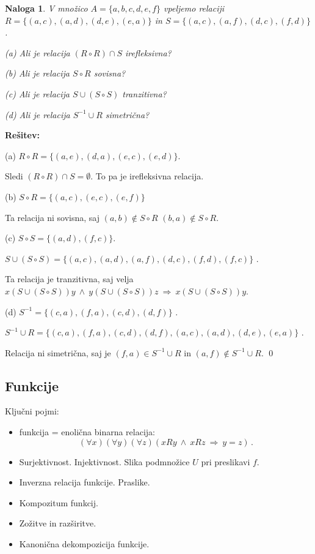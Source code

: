 \documentclass[11pt,paper=b5,footinclude,headinclude]{scrbook} %
\def\inn {{~\wedge~}}
\def\sledi {{~\Rightarrow~}}
\newtheorem*{problem}{Naloga}
\begin{document}
\begin{problem}
V množico $A = \{a, b, c, d, e, f \}$ vpeljemo relaciji
$R = \{(a, c), (a, d), (d, e), (e, a)\}$ in
$S = \{(a, c), (a, f), (d, c), (f, d)\}$ .

(a) Ali je relacija $(R\circ R)\cap S$ irefleksivna?

(b) Ali je relacija $S\circ R$ sovisna?

(c) Ali je relacija $S\cup (S\circ S)$ tranzitivna?

(d) Ali je relacija $S^{-1}\cup R$ simetrična?
\end{problem}

\textbf{Rešitev:}

(a)
$R\circ R = \{(a,e), (d,a), (e,c), (e,d)\}$.

Sledi
$(R\circ R)\cap S = \emptyset$. To pa je irefleksivna relacija.

(b) $S\circ R = \{(a,c), (e,c), (e,f)\}$

Ta relacija ni sovisna, saj $(a,b)\not\in S\circ R$
$(b,a)\not\in S\circ R$.

(c)
$S\circ S = \{(a,d), (f,c)\}$.

$S\cup (S\circ S)= \{(a, c), (a,d), (a, f), (d, c), (f, d), (f,c)\}$ .

Ta relacija je tranzitivna, saj velja $x(S\cup (S\circ S))y\inn
y(S\cup (S\circ S))z\sledi x(S\cup (S\circ S))y$.

(d)
$S^{-1} = \{(c, a), (f, a), (c, d), (d, f)\}$ .

$S^{-1}\cup R = \{(c, a), (f, a), (c, d), (d, f),
(a, c), (a, d), (d, e), (e, a)\}$ .

Relacija ni simetrična, saj je $(f,a)\in S^{-1}\cup R$ in $(a,f)\not\in S^{-1}\cup R$.
\qed


\subsection{Funkcije}

Ključni pojmi:
\begin{itemize}
  \item funkcija = enolična binarna relacija:
  $$(\forall x)(\forall y)(\forall z)(xRy\inn xRz\sledi y = z)\,.$$
  \item Surjektivnost. Injektivnost. Slika podmnožice $U$ pri preslikavi $f$.
  \item Inverzna relacija funkcije. Praslike.
  \item Kompozitum funkcij.
  \item Zožitve in razširitve.
  \item Kanonična dekompozicija funkcije.
\end{itemize}
\end{document}

